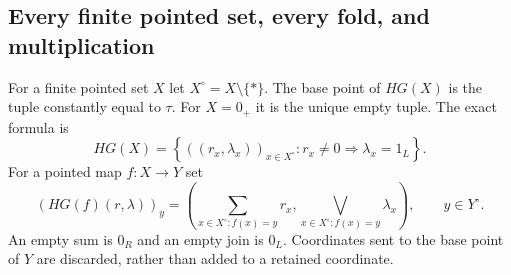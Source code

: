 \subsection{Every finite pointed set, every fold, and multiplication}

For a finite pointed set $X$ let $X^\circ=X\setminus\{*\}$.
The base point of $HG(X)$ is the tuple constantly equal to $\tau$.
For $X=0_+$ it is the unique empty tuple.  The exact formula is
\begin{equation}\tag{HG2}
 HG(X)=\left\{((r_x,\lambda_x))_{x\in X^\circ}:
       r_x\ne0\Longrightarrow\lambda_x=1_L\right\}.
\end{equation}
For a pointed map $f:X\to Y$ set
\begin{equation}\tag{HG3}
 (HG(f)(r,\lambda))_y=
 \left(\sum_{x\in X^\circ:f(x)=y}r_x,
       \bigvee_{x\in X^\circ:f(x)=y}\lambda_x\right),
 \qquad y\in Y^\circ.
\end{equation}
An empty sum is $0_R$ and an empty join is $0_L$.  Coordinates sent
to the base point of $Y$ are discarded, rather than added to a
retained coordinate.

